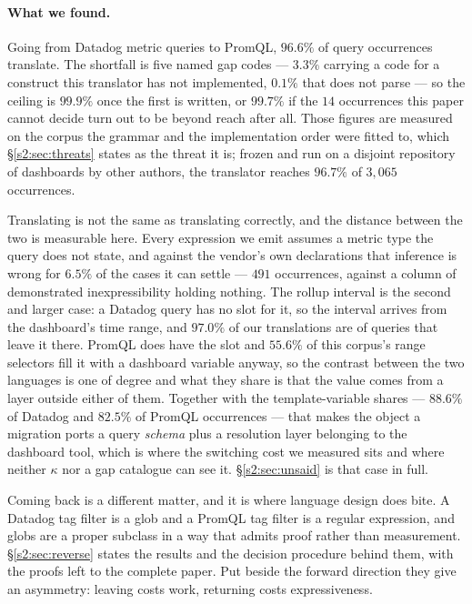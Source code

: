 \paragraph{What we found.}
Going from Datadog metric queries to PromQL, $96.6\%$ of query occurrences translate. The
shortfall is five named gap codes --- $3.3\%$ carrying a code for a construct this
translator has not implemented, $0.1\%$ that does not parse --- so the ceiling is $99.9\%$
once the first is written, or $99.7\%$ if the $14$ occurrences this paper cannot decide
turn out to be beyond reach after all. Those figures are measured on the corpus the grammar
and the implementation order were fitted to, which \S\ref{s2:sec:threats} states as the
threat it is; frozen and run on a disjoint repository of dashboards by other authors, the
translator reaches $96.7\%$ of $3{,}065$ occurrences.

Translating is not the same as translating correctly, and the distance between the two is
measurable here. Every expression we emit assumes a metric type the query does not state,
and against the vendor's own declarations that inference is wrong for $6.5\%$ of the cases
it can settle --- $491$ occurrences, against a column of demonstrated inexpressibility
holding nothing. The rollup interval is the second and larger case: a Datadog query has no
slot for it, so the interval arrives from the dashboard's time range, and $97.0\%$ of our
translations are of queries that leave it there. PromQL does have the slot and $55.6\%$ of
this corpus's range selectors fill it with a dashboard variable anyway, so the contrast
between the two languages is one of degree and what they share is that the value comes from
a layer outside either of them. Together with the template-variable shares --- $88.6\%$ of
Datadog and $82.5\%$ of PromQL occurrences --- that makes the object a migration ports a
query \emph{schema} plus a resolution layer belonging to the dashboard tool, which is where
the switching cost we measured sits and where neither $\kappa$ nor a gap catalogue can see
it. \S\ref{s2:sec:unsaid} is that case in full.

Coming back is a different matter, and it is where language design does bite. A Datadog
tag filter is a glob and a PromQL tag filter is a regular expression, and globs are a
proper subclass in a way that admits proof rather than measurement.
\S\ref{s2:sec:reverse} states the results and the decision procedure behind them, with the
proofs left to the complete paper. Put beside the forward direction they give an asymmetry:
leaving costs work, returning costs expressiveness.

